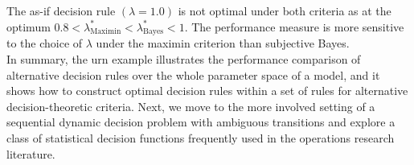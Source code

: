 The as-if decision rule $(\lambda=1.0)$ is not optimal under both criteria as at the optimum  $0.8 < \lambda^*_{\text{Maximin}} < \lambda^*_{\text{Bayes}} < 1$. The performance measure is more sensitive to the choice of $\lambda$ under the maximin criterion than subjective Bayes.\\

In summary, the urn example illustrates the performance comparison of alternative decision rules over the whole parameter space of a model, and it shows how to construct optimal decision rules within a set of rules for alternative decision-theoretic criteria. Next, we move to the more involved setting of a sequential dynamic decision problem with ambiguous transitions and explore a class of statistical decision functions frequently used in the operations research literature.
